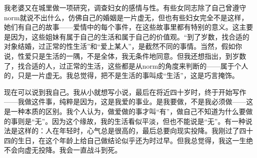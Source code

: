 我老婆又在城里做一项研究，调查妇女的感情与性。有些女同志除了自己曾遵守norm就说不出什么，仿佛自己的婚姻是一片虚无，但也有些妇女完全不是这样，她们有自己的故事——爱情中的每个事件，在这些故事里都有特别的意义。这主要是因为，这些姐妹有属于自己的生活和属于自己的价值观。“到了岁数，找合适的对象结婚，过正常的性生活”和“爱上某人”，是截然不同的事情。当然，假如你说，性爱只是生活的一隅，不是全体，我无条件地同意。但我还想指出，到岁数了，找合适的人，过正常的生活，这些都是从norm的角度来判断的——属于个人的，只是一片虚无。我总觉得，把不是生活的事叫成“生活”，这是巧言掩饰。


现在可以说到我自己。我从小就想写小说，最后在将近四十岁时，终于开始写作——我做这件事，纯粹是因为，这是我爱的事业。是我要做，不是我必须做——这是一种本质的区别。我个人认为，做爱做的事才叫“有”，做自己不知道为什么要做的事则是“无”。因为这个缘故，我的生活看似平淡，但也不能说是“无”。有一种说法是这样的：人在年轻时，心气总是很高的，最后总要向现实投降。我刚过了四十四的生日，在这个年龄上给自己做结论似乎还为时过早。但我总觉得，我这一生绝不会向虚无投降。我会一直战斗到死。



